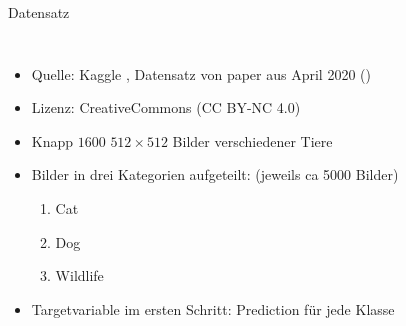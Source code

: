 \documentclass[aspectratio=1610, 9pt]{beamer}
\begin{document}
\begin{frame}{Datensatz}
  \begin{columns}


    \begin{itemize}
    \item Quelle: Kaggle \cite{kaggle}, Datensatz von paper aus April 2020 (\cite{choi2020starganv2})
    \item Lizenz: CreativeCommons (CC BY-NC 4.0)
    \item Knapp $1600$ $512\times 512$ Bilder verschiedener Tiere
    \item Bilder in drei Kategorien aufgeteilt: (jeweils ca 5000 Bilder)
      \begin{enumerate}
      \item Cat
      \item Dog
      \item Wildlife
      \end{enumerate}
    \item Targetvariable im ersten Schritt: Prediction für jede Klasse
    \end{itemize}


\end{columns}
\end{frame}
\end{document}
